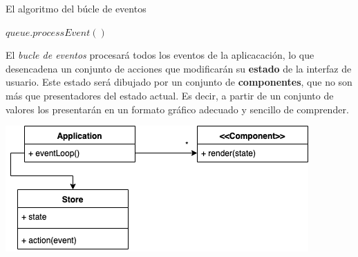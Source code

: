 \begin{algorithm}
	\caption{El algoritmo del búcle de eventos}
	\label{alg:eventloop}
 \begin{algorithmic}
 		\State $queue.processEvent()$
 	\EndWhile
 \end{algorithmic}
\end{algorithm}
 
 El  \textit{bucle de eventos} procesará todos los eventos de la aplicacación, lo que desencadena un conjunto de acciones que modificarán su \textbf{estado} de la interfaz de usuario. Este estado será dibujado por un conjunto de \textbf{componentes}, que no son más que presentadores del estado actual. Es decir, a partir de un conjunto de valores los presentarán en un formato gráfico adecuado y sencillo de comprender.

\vspace{5mm}
\begin{minipage}[h]{0.8\linewidth}
	\centering
	\includegraphics[width=\linewidth]{assets/ui}
	\label{img:ui}
\end{minipage}

\label{sec:ui}